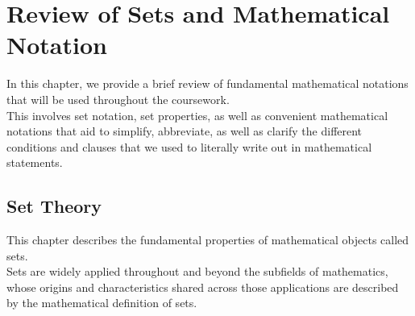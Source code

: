 \chapter{Review of Sets and Mathematical Notation}
In this chapter, we provide a brief review of fundamental mathematical notations that will be used throughout the coursework. \\
This involves set notation, set properties, as well as convenient mathematical notations that aid to simplify, abbreviate, as well as clarify the different conditions and clauses that we used to literally write out in mathematical statements.

\section{Set Theory}
This chapter describes the fundamental properties of mathematical objects called sets. \\
Sets are widely applied throughout and beyond the subfields of mathematics, whose origins and characteristics shared across those applications are described by the mathematical definition of sets.

